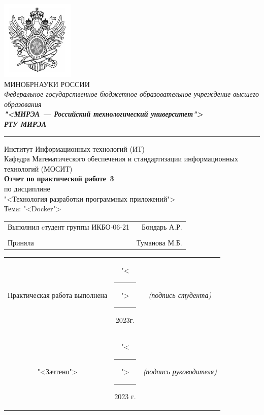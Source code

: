 \begin{titlepage}
	
	\thispagestyle{fancy}
	\renewcommand{\headrulewidth}{0pt}

	\begin{center}
		\includegraphics[scale=0.5]{./res/logo.png}\\
		МИНОБРНАУКИ РОССИИ\\
		\textit{Федеральное государственное бюджетное
		образовательное учреждение высшего образования}\\
		\textbf{\textit{"<МИРЭА --- Российский технологический
		университет">}}\\
		{\large\bfseries\itshape РТУ МИРЭА}\\
		\bigskip \hrule \smallskip
		Институт Информационных технологий (ИТ)\\
		\vfill
		Кафедра Математического обеспечения и стандартизации
		информационных технологий (МОСИТ)\\
		\vfill
		\textbf{
			Отчет по практической работе \No\,3\\
		}
		по дисциплине\\
		"<Технология разработки программных приложений">\\
		Тема: "<Docker">
		\vfill
		\vfill
		\begin{small}
			\begin{tabular}{lr}
				Выполнил cтудент группы ИКБО-06-21 & Бондарь А.Р.\\\\
				Приняла & Туманова М.Б.\\
			\end{tabular}
		\end{small}
		\vfill
		\begin{footnotesize}
			\begin{tabular}{ccc}
				Практическая  работа выполнена
				& "<\rule{1ex}{.5pt}">\rule{7ex}{.5pt}2023г.
				& \textit{(подпись студента)}\\
				"<Зачтено"> 
				& "<\rule{1ex}{.5pt}">\rule{7ex}{.5pt}2023 г.
				& \textit{(подпись руководителя)}\\
			\end{tabular}
		\end{footnotesize}
		\vfill
	\end{center}
\end{titlepage}
\setcounter{page}{2}
\clearpage

